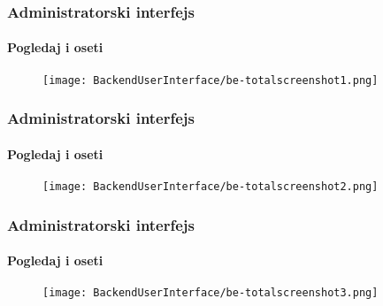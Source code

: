 
\begin{frame}[fragile]
	\frametitle{Administratorski interfejs }
	\framesubtitle{Pogledaj i oseti}

	\begin{figure}
		\texttt{[image: BackendUserInterface/be-totalscreenshot1.png]}
	\end{figure}

\end{frame}


\begin{frame}[fragile]
	\frametitle{Administratorski interfejs }
	\framesubtitle{Pogledaj i oseti}

	\begin{figure}
		\texttt{[image: BackendUserInterface/be-totalscreenshot2.png]}
	\end{figure}

\end{frame}


\begin{frame}[fragile]
	\frametitle{Administratorski interfejs }
	\framesubtitle{Pogledaj i oseti}

	\begin{figure}
		\texttt{[image: BackendUserInterface/be-totalscreenshot3.png]}
	\end{figure}

\end{frame}

